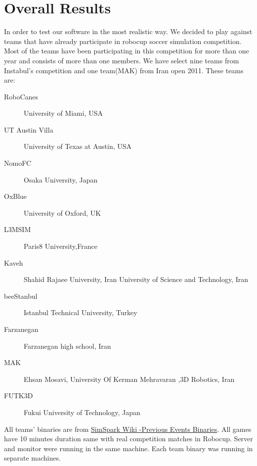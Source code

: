 \section{Overall Results}
In order to test our software in the most realistic way. We decided to play against teams that have already participate in robocup soccer simulation competition. Most of the teams have been participating in this competition for more than one year and consists of more than one members. We have select nine teams from Instabul's competition and one team(MAK) from Iran open 2011. These teams are:
\begin{description}
\item[RoboCanes]	University of Miami, USA 
\item[UT Austin Villa]	University of Texas at Austin, USA
\item[NomoFC]	Osaka University, Japan
\item[OxBlue]	University of Oxford, UK
\item[L3MSIM]	Paris8 University,France
\item[Kaveh] 	Shahid Rajaee University, Iran University of Science and Technology, Iran
\item[beeStanbul]	Istanbul Technical University, Turkey
\item[Farzanegan]	Farzanegan high school, Iran
\item[MAK]	Ehsan Mosavi, University Of Kerman Mehravaran ,3D Robotics, Iran
\item[FUTK3D]	Fukui University of Technology, Japan
\end{description}
All teams' binaries are from \href{http://simspark.sourceforge.net/binaries/RoboCup2011/}{SimSpark Wiki -Previous Events Binaries}.
All games have 10 minutes duration same with real competition matches in Robocup. Server and monitor were running in the same machine\footnotemark. Each team binary was running in separate machines\footnotemark.
